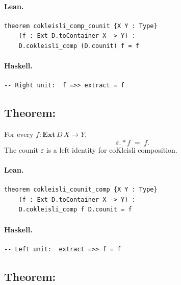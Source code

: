 \documentclass[11pt,a4paper]{article}
\begin{document}
\paragraph{Lean.}
\begin{lstlisting}[style=lean]
theorem cokleisli_comp_counit {X Y : Type}
    (f : Ext D.toContainer X -> Y) :
    D.cokleisli_comp (D.counit) f = f
\end{lstlisting}

\paragraph{Haskell.}
\begin{lstlisting}[style=haskell]
-- Right unit:  f =>> extract = f
\end{lstlisting}


\subsection{Theorem: }

\begin{thm}
For every $f : \mathbf{Ext}\,D\,X \to Y$,
\[
  \varepsilon \mathbin{.*} f \;=\; f.
\]
The counit $\varepsilon$ is a left identity for coKleisli composition.
\end{thm}

\paragraph{Lean.}
\begin{lstlisting}[style=lean]
theorem cokleisli_counit_comp {X Y : Type}
    (f : Ext D.toContainer X -> Y) :
    D.cokleisli_comp f D.counit = f
\end{lstlisting}

\paragraph{Haskell.}
\begin{lstlisting}[style=haskell]
-- Left unit:  extract =>> f = f
\end{lstlisting}


\subsection{Theorem: }
\end{document}
